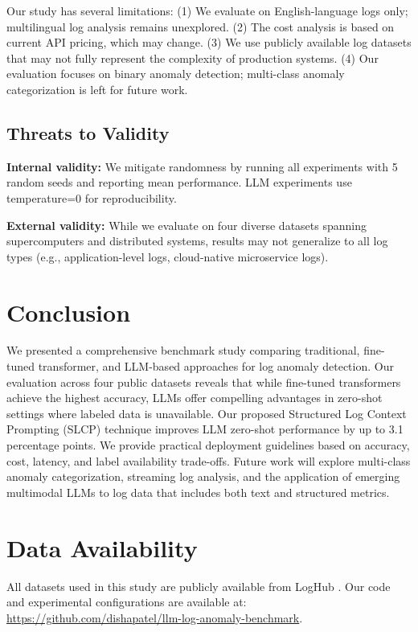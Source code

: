 \documentclass[conference]{IEEEtran}
\begin{document}
Our study has several limitations: (1) We evaluate on English-language logs only; multilingual log analysis remains unexplored. (2) The cost analysis is based on current API pricing, which may change. (3) We use publicly available log datasets that may not fully represent the complexity of production systems. (4) Our evaluation focuses on binary anomaly detection; multi-class anomaly categorization is left for future work.

\subsection{Threats to Validity}

\textbf{Internal validity:} We mitigate randomness by running all experiments with 5 random seeds and reporting mean performance. LLM experiments use temperature=0 for reproducibility.

\textbf{External validity:} While we evaluate on four diverse datasets spanning supercomputers and distributed systems, results may not generalize to all log types (e.g., application-level logs, cloud-native microservice logs).

\section{Conclusion}

We presented a comprehensive benchmark study comparing traditional, fine-tuned transformer, and LLM-based approaches for log anomaly detection. Our evaluation across four public datasets reveals that while fine-tuned transformers achieve the highest accuracy, LLMs offer compelling advantages in zero-shot settings where labeled data is unavailable. Our proposed Structured Log Context Prompting (SLCP) technique improves LLM zero-shot performance by up to 3.1 percentage points. We provide practical deployment guidelines based on accuracy, cost, latency, and label availability trade-offs. Future work will explore multi-class anomaly categorization, streaming log analysis, and the application of emerging multimodal LLMs to log data that includes both text and structured metrics.

\section*{Data Availability}

All datasets used in this study are publicly available from LogHub \cite{zhu2023loghub}. Our code and experimental configurations are available at: \url{https://github.com/dishapatel/llm-log-anomaly-benchmark}.
\end{document}
